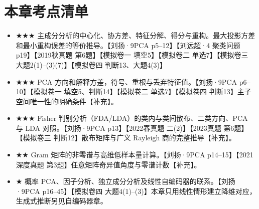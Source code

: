 \documentclass[UTF8,a4paper,zihao=-4,fontset=fandol]{ctexrep}
\begin{document}
\section{本章考点清单}
\begin{itemize}[leftmargin=2em]
\item \(\bigstar \bigstar \bigstar\) 主成分分析的中心化、协方差、特征分解、得分与重构。最大投影方差和最小重构误差的等价推导。【刘扬·9PCA p5--12】【刘远超·4 聚类问题 p19】【2019秋真题 第6题】【模拟卷一 填空5】【模拟卷二 单选7】【模拟卷三 大题2(1)--(3)(7)】【模拟卷四 判断13、大题4(3)】
\item \(\bigstar \bigstar \bigstar\) PCA 方向和解释方差，符号、重根与丢弃特征值。【刘扬·9PCA p6--10】【模拟卷一 填空5、判断14】【模拟卷二 单选7】【模拟卷四 判断13】主子空间唯一性的明确条件【补充】。
\item \(\bigstar \bigstar \bigstar\) Fisher 判别分析（FDA/LDA）的类内与类间散布、二类方向、PCA 与 LDA 对照。【刘扬·9PCA p13】【2022春真题 二(2)】【2023真题 第6题】【模拟卷三 判断12】散布矩阵与广义 Rayleigh 商的完整推导【补充】。
\item \(\bigstar \bigstar\) Gram 矩阵的非零谱与高维低样本量计算。【刘扬·9PCA p14--15】【2021深度真题 第3题】任意矩阵奇异值角度与零谱计数【补充】。
\item \(\bigstar\) 概率 PCA、因子分析、独立成分分析及线性自编码器的联系。【刘扬·9PCA p16--45】【模拟卷四 大题4(1)--(3)】本章只用线性情形建立降维对应，生成式推断另见自编码器章。
\end{itemize}
\end{document}
